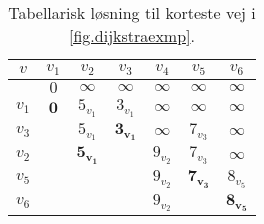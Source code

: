 \begin{table}[H]
\centering
\begin{tabular}{|c|c|c|c|c|c|c|}
\hline
$v$ & $v_1$ & $v_2$ & $v_3$ & $v_4$ & $v_5$ & $v_6$ \\ \hline
  & $0$ &  $\infty$ & $\infty$  & $\infty$  &  $\infty$  &  $\infty$  \\  
 $v_1$ & $\boldsymbol{0}$ & $5_{v_1}$ & $3_{v_1}$ & $\infty$ & $\infty$ & $\infty$ \\  
 $v_3$ &  & $5_{v_1}$ & $\boldsymbol{3_{v_1}}$ & $\infty$ & $7_{v_3}$ & $\infty$ \\  
 $v_2$ &  & $\boldsymbol{5_{v_1}}$ &  & $9_{v_2}$ & $7_{v_3}$ & $\infty$ \\
 $v_5$ &  &  &  & $9_{v_2}$ & $\boldsymbol{7_{v_3}}$ & $8_{v_5}$   \\
 $v_6$ &  &  &  & $9_{v_2}$ &  & $\boldsymbol{8_{v_5}}$   \\ \hline
\end{tabular}
\caption{Tabellarisk løsning til korteste vej i \autoref{fig.dijkstraexmp}.}
\label{tab:dijkstraexmp}
\end{table}
